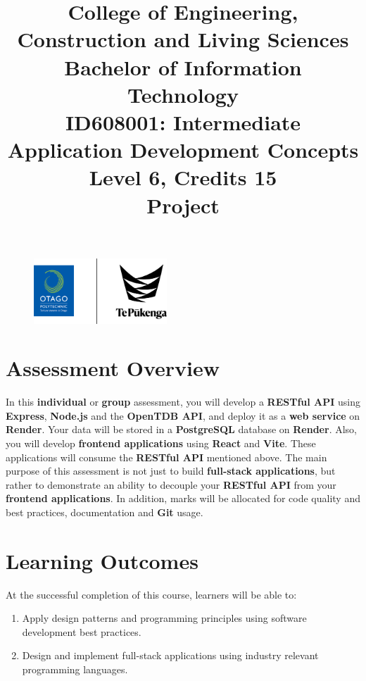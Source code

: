 \documentclass{article}
\author{}
\begin{document}
\begin{figure}
	\centering
	\includegraphics[width=50mm]{../../resources/img/logo.png}
\end{figure}

\title{College of Engineering, Construction and Living Sciences\\Bachelor of Information Technology\\ID608001: Intermediate Application Development Concepts\\Level 6, Credits 15\\\textbf{Project}}
\date{}
\maketitle

\section*{Assessment Overview}
In this \textbf{individual} or \textbf{group} assessment, you will develop a \textbf{RESTful API} using \textbf{Express}, \textbf{Node.js} and the \textbf{OpenTDB API}, and deploy it as a \textbf{web service} on \textbf{Render}. Your data will be stored in a \textbf{PostgreSQL} database on \textbf{Render}. Also, you will develop \textbf{frontend applications} using \textbf{React} and \textbf{Vite}. These applications will consume the \textbf{RESTful API} mentioned above. The main purpose of this assessment is not just to build \textbf{full-stack applications}, but rather to demonstrate an ability to decouple your \textbf{RESTful API} from your \textbf{frontend applications}. In addition, marks will be allocated for code quality and best practices, documentation and \textbf{Git} usage.

\section*{Learning Outcomes}
At the successful completion of this course, learners will be able to:
\begin{enumerate}
	\item Apply design patterns and programming principles using software development best practices.
	\item Design and implement full-stack applications using industry relevant programming languages.
\end{enumerate}
\end{document}
